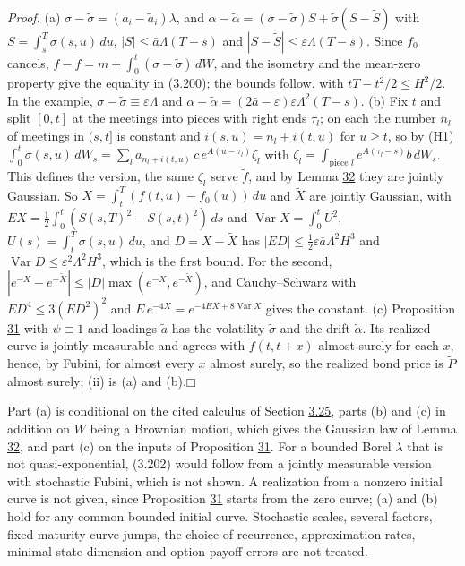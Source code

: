 \documentclass[11pt]{article}
\providecommand{\square}{\mdlgwhtsquare}
\begin{document}
\emph{Proof.} (a) \(\sigma-\tilde\sigma=(a_i-\tilde a_i)\lambda\), and \(\alpha-\tilde\alpha=(\sigma-\tilde\sigma)S+\tilde\sigma(S-\tilde S)\) with \(S=\int_s^T\sigma(s,u)\,du\), \(|S|\le\bar a\Lambda(T-s)\) and \(|S-\tilde S|\le\varepsilon\Lambda(T-s)\). Since \(f_0\) cancels, \(f-\tilde f=m+\int_0^t(\sigma-\tilde\sigma)\,dW\), and the isometry and the mean-zero property give the equality in (3.200); the bounds follow, with \(tT-t^2/2\le H^2/2\). In the example, \(\sigma-\tilde\sigma\equiv\varepsilon\Lambda\) and \(\alpha-\tilde\alpha=(2\bar a-\varepsilon)\varepsilon\Lambda^2(T-s)\). (b) Fix \(t\) and split \([0,t]\) at the meetings into pieces with right ends \(\tau_l\); on each the number \(n_l\) of meetings in \((s,t]\) is constant and \(i(s,u)=n_l+i(t,u)\) for \(u\ge t\), so by (H1) \(\int_0^t\sigma(s,u)\,dW_s=\sum_la_{n_l+i(t,u)}\,c\,e^{A(u-\tau_l)}\zeta_l\) with \(\zeta_l=\int_{\text{piece }l}e^{A(\tau_l-s)}b\,dW_s\). This defines the version, the same \(\zeta_l\) serve \(\tilde f\), and by Lemma \hyperref[res:Lemma-32]{32} they are jointly Gaussian. So \(X=\int_t^T(f(t,u)-f_0(u))\,du\) and \(\tilde X\) are jointly Gaussian, with \(EX=\frac12\int_0^t(S(s,T)^2-S(s,t)^2)\,ds\) and \(\operatorname{Var}X=\int_0^tU^2\), \(U(s)=\int_t^T\sigma(s,u)\,du\), and \(D=X-\tilde X\) has \(|ED|\le\frac12\varepsilon\bar a\Lambda^2H^3\) and \(\operatorname{Var}D\le\varepsilon^2\Lambda^2H^3\), which is the first bound. For the second, \(|e^{-X}-e^{-\tilde X}|\le|D|\max(e^{-X},e^{-\tilde X})\), and Cauchy--Schwarz with \(ED^4\le3(ED^2)^2\) and \(E\,e^{-4X}=e^{-4EX+8\operatorname{Var}X}\) gives the constant. (c) Proposition \hyperref[res:Proposition-31]{31} with \(\psi\equiv1\) and loadings \(\tilde a\) has the volatility \(\tilde\sigma\) and the drift \(\tilde\alpha\). Its realized curve is jointly measurable and agrees with \(\tilde f(t,t+x)\) almost surely for each \(x\), hence, by Fubini, for almost every \(x\) almost surely, so the realized bond price is \(\tilde P\) almost surely; (ii) is (a) and (b).\hfill$\square$

Part (a) is conditional on the cited calculus of Section \hyperref[sec:3.25]{3.25}, parts (b) and (c) in addition on \(W\) being a Brownian motion, which gives the Gaussian law of Lemma \hyperref[res:Lemma-32]{32}, and part (c) on the inputs of Proposition \hyperref[res:Proposition-31]{31}. For a bounded Borel \(\lambda\) that is not quasi-exponential, (3.202) would follow from a jointly measurable version with stochastic Fubini, which is not shown. A realization from a nonzero initial curve is not given, since Proposition \hyperref[res:Proposition-31]{31} starts from the zero curve; (a) and (b) hold for any common bounded initial curve. Stochastic scales, several factors, fixed-maturity curve jumps, the choice of recurrence, approximation rates, minimal state dimension and option-payoff errors are not treated.
\end{document}
